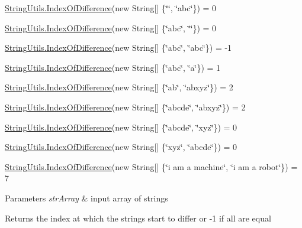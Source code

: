 \hyperlink{class_ultimate_1_1_utilities_1_1_string_utils_a991ddd501f079758a091137cfa8dd59d}{String\+Utils.\+Index\+Of\+Difference}(new String\mbox{[}\mbox{]} \{\char`\"{}\char`\"{}, \char`\"{}abc\char`\"{}\}) = 0 

\hyperlink{class_ultimate_1_1_utilities_1_1_string_utils_a991ddd501f079758a091137cfa8dd59d}{String\+Utils.\+Index\+Of\+Difference}(new String\mbox{[}\mbox{]} \{\char`\"{}abc\char`\"{}, \char`\"{}\char`\"{}\}) = 0 

\hyperlink{class_ultimate_1_1_utilities_1_1_string_utils_a991ddd501f079758a091137cfa8dd59d}{String\+Utils.\+Index\+Of\+Difference}(new String\mbox{[}\mbox{]} \{\char`\"{}abc\char`\"{}, \char`\"{}abc\char`\"{}\}) = -\/1 

\hyperlink{class_ultimate_1_1_utilities_1_1_string_utils_a991ddd501f079758a091137cfa8dd59d}{String\+Utils.\+Index\+Of\+Difference}(new String\mbox{[}\mbox{]} \{\char`\"{}abc\char`\"{}, \char`\"{}a\char`\"{}\}) = 1 

\hyperlink{class_ultimate_1_1_utilities_1_1_string_utils_a991ddd501f079758a091137cfa8dd59d}{String\+Utils.\+Index\+Of\+Difference}(new String\mbox{[}\mbox{]} \{\char`\"{}ab\char`\"{}, \char`\"{}abxyz\char`\"{}\}) = 2 

\hyperlink{class_ultimate_1_1_utilities_1_1_string_utils_a991ddd501f079758a091137cfa8dd59d}{String\+Utils.\+Index\+Of\+Difference}(new String\mbox{[}\mbox{]} \{\char`\"{}abcde\char`\"{}, \char`\"{}abxyz\char`\"{}\}) = 2 

\hyperlink{class_ultimate_1_1_utilities_1_1_string_utils_a991ddd501f079758a091137cfa8dd59d}{String\+Utils.\+Index\+Of\+Difference}(new String\mbox{[}\mbox{]} \{\char`\"{}abcde\char`\"{}, \char`\"{}xyz\char`\"{}\}) = 0 

\hyperlink{class_ultimate_1_1_utilities_1_1_string_utils_a991ddd501f079758a091137cfa8dd59d}{String\+Utils.\+Index\+Of\+Difference}(new String\mbox{[}\mbox{]} \{\char`\"{}xyz\char`\"{}, \char`\"{}abcde\char`\"{}\}) = 0 

\hyperlink{class_ultimate_1_1_utilities_1_1_string_utils_a991ddd501f079758a091137cfa8dd59d}{String\+Utils.\+Index\+Of\+Difference}(new String\mbox{[}\mbox{]} \{\char`\"{}i am a machine\char`\"{}, \char`\"{}i am a robot\char`\"{}\}) = 7 


\begin{DoxyParams}{Parameters}
{\em str\+Array} & input array of strings\\
\hline
\end{DoxyParams}
\begin{DoxyReturn}{Returns}
the index at which the strings start to differ or -\/1 if all are equal
\end{DoxyReturn}
